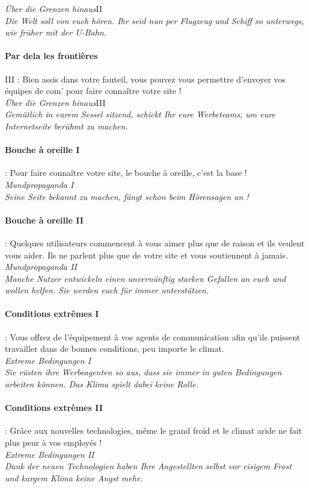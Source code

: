 \documentclass[10pt,a4paper]{article}
\begin{document}
\textit{Über die Grenzen hinaus}II\\
\textit{Die Welt soll von euch hören. Ihr seid nun per Flugzeug und Schiff so unterwegs, wie früher mit der U-Bahn.}


\paragraph{Par dela les frontières} III : Bien assis dans votre fauteil, vous pouvez vous permettre d'envoyer vos équipes de com' pour faire connaître votre site !\\

\textit{Über die Grenzen hinaus}III\\
\textit{Gemütlich in eurem Sessel sitzend, schickt Ihr eure Werbeteams, um eure Internetseite berühmt zu machen.}


\paragraph{Bouche à oreille I} : Pour faire connaître votre site, le bouche à oreille, c'est la base !\\

\textit{Mundpropaganda I}\\
\textit{Seine Seite bekannt zu machen, fängt schon beim Hörensagen an !}


\paragraph{Bouche à oreille II} : Quelques utilisateurs commencent à vous aimer plus que de raison et ils veulent vous aider. Ils ne parlent plus que de votre site et vous soutiennent à jamais.\\

\textit{Mundpropaganda II}\\
\textit{Manche Nutzer entwickeln einen unvernünftig starken Gefallen an euch und wollen helfen. Sie werden euch für immer unterstützen.}


\paragraph{Conditions extrêmes I} : Vous offrez de l'équipement à vos agents de communication afin qu'ils puissent travailler dans de bonnes conditions, peu importe le climat.\\

\textit{Extreme Bedingungen I}\\
\textit{Sie rüsten ihre Werbeagenten so aus, dass sie immer in guten Bedingungen arbeiten können. Das Klima spielt dabei keine Rolle.}


\paragraph{Conditions extrêmes II} : Grâce aux nouvelles technologies, même le grand froid et le climat aride ne fait plus peur à vos employés !\\

\textit{Extreme Bedingungen II}\\
\textit{Dank der neuen Technologien haben Ihre Angestellten selbst vor eisigem Frost und kargem Klima keine Angst mehr.}
\end{document}
